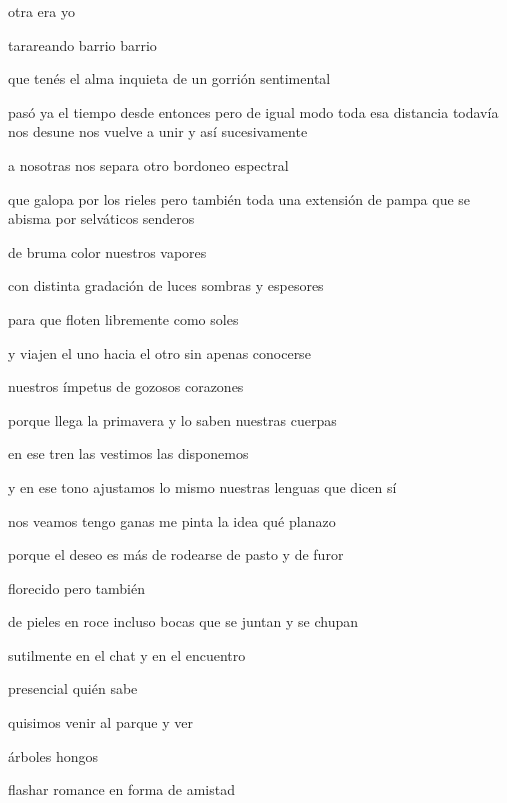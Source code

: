 \documentclass[
]{book}
\begin{document}
otra era yo

tarareando barrio barrio

que tenés el alma inquieta de un gorrión sentimental

pasó ya el tiempo desde entonces pero de igual modo toda esa distancia todavía nos desune nos vuelve a unir y así sucesivamente

a nosotras nos separa otro bordoneo espectral

que galopa por los rieles pero también toda una extensión de pampa que se abisma por selváticos senderos

de bruma color nuestros vapores

con distinta gradación de luces sombras y espesores

para que floten libremente como soles

y viajen el uno hacia el otro sin apenas conocerse

nuestros ímpetus de gozosos corazones

porque llega la primavera y lo saben nuestras cuerpas

en ese tren las vestimos las disponemos

y en ese tono ajustamos lo mismo nuestras lenguas que dicen sí

nos veamos tengo ganas me pinta la idea qué planazo

porque el deseo es más de rodearse de pasto y de furor

florecido pero también

de pieles en roce incluso bocas que se juntan y se chupan

sutilmente en el chat y en el encuentro

presencial quién sabe

quisimos venir al parque y ver

árboles hongos

flashar romance en forma de amistad
\end{document}
